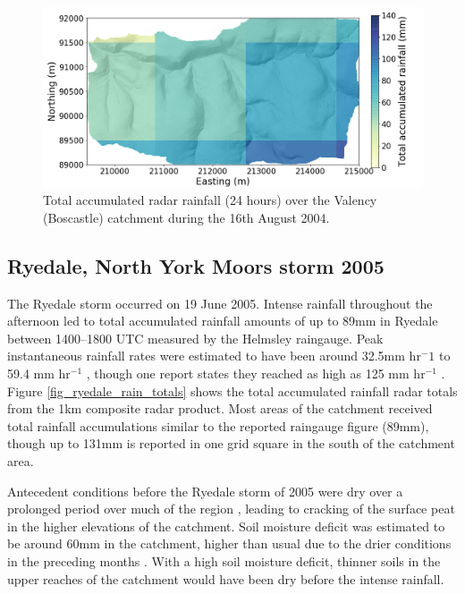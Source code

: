 \begin{figure}[htb]
\includegraphics[width=15cm]{chp_events_figures_scripts/figure_boscastle_total_rainfall.png}
\caption{Total accumulated radar rainfall (24 hours) over the Valency (Boscastle) catchment during the 16th August 2004.}
\label{fig_boscastle_rain_totals}
\end{figure}


\subsection{Ryedale, North York Moors storm 2005}
The Ryedale storm occurred on 19 June 2005. Intense rainfall throughout the afternoon led to total accumulated rainfall amounts of up to 89mm in Ryedale between 1400--1800 UTC measured by the Helmsley raingauge. Peak instantaneous rainfall rates were estimated to have been around 32.5mm hr\(^-1\) \citep{sibley2009analysis} to 59.4 mm hr\(^{-1}\) \citep{hopkins2012knowledge}, though one report states they reached as high as 125 mm hr\(^{-1}\) \citep{cinderey2005north}. Figure \ref{fig_ryedale_rain_totals} shows the total accumulated rainfall radar totals from the 1km composite radar product. Most areas of the catchment received total rainfall accumulations similar to the reported raingauge figure (89mm), though up to 131mm is reported in one grid square in the south of the catchment area.

Antecedent conditions before the Ryedale storm of 2005 were dry over a prolonged period over much of the region \citep{sibley2009analysis}, leading to cracking of the surface peat in the higher elevations of the catchment. Soil moisture deficit was estimated to be around 60mm in the catchment, higher than usual due to the drier conditions in the preceding months \citep{wass2008investigation}. With a high soil moisture deficit, thinner soils in the upper reaches of the catchment would have been dry before the intense rainfall.

